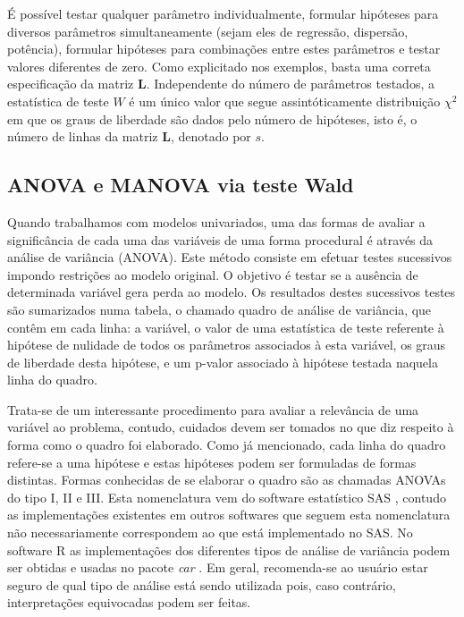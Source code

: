 É possível testar qualquer parâmetro individualmente, formular hipóteses para diversos parâmetros simultaneamente (sejam eles de regressão, dispersão, potência), formular hipóteses para combinações entre estes parâmetros e testar valores diferentes de zero. Como explicitado nos exemplos, basta uma correta especificação da matriz $\boldsymbol{L}$. Independente do número de parâmetros testados, a estatística de teste $W$ é um único valor que segue assintóticamente distribuição $\chi^2$ em que os graus de liberdade são dados pelo número de hipóteses, isto é, o número de linhas da matriz $\boldsymbol{L}$, denotado por $s$.

\subsection{ANOVA e MANOVA via teste Wald}

Quando trabalhamos com modelos univariados, uma das formas de avaliar a significância de cada uma das variáveis de uma forma procedural é através da análise de variância (ANOVA). Este método consiste em efetuar testes sucessivos impondo restrições ao modelo original. O objetivo é testar se a ausência de determinada variável gera perda ao modelo. Os resultados destes sucessivos testes são sumarizados numa tabela, o chamado quadro de análise de variância, que contêm em cada linha: a variável, o valor de uma estatística de teste referente à hipótese de nulidade de todos os parâmetros associados à esta variável, os graus de liberdade desta hipótese, e um p-valor associado à hipótese testada naquela linha do quadro.

Trata-se de um interessante procedimento para avaliar a relevância de uma variável ao problema, contudo, cuidados devem ser tomados no que diz respeito à forma como o quadro foi elaborado. Como já mencionado, cada linha do quadro refere-se a uma hipótese e estas hipóteses podem ser formuladas de formas distintas. Formas conhecidas de se elaborar o quadro são as chamadas ANOVAs do tipo I, II e III. Esta nomenclatura vem do software estatístico SAS \citep{sas}, contudo  as implementações existentes em outros softwares que seguem esta nomenclatura não necessariamente correspondem ao que está implementado no SAS. No software R \citep{softwareR} as implementações dos diferentes tipos de análise de variância podem ser obtidas e usadas no pacote \emph{car} \citep{car}. Em geral, recomenda-se ao usuário estar seguro de qual tipo de análise está sendo utilizada pois, caso contrário, interpretações equivocadas podem ser feitas.

